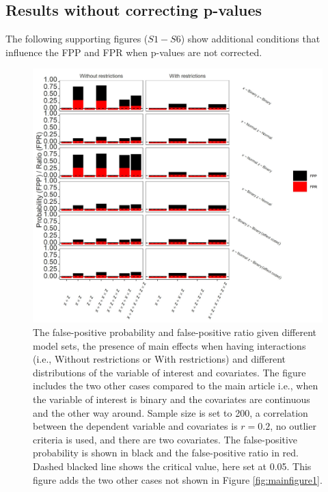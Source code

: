 \subsection{Results without correcting p-values}
The following supporting figures ($S1 - S6$) show additional conditions that influence the FPP and FPR when p-values are not corrected.

\label{result}
\begin{figure}[ht!]
\includegraphics[width=1\textwidth]{R/Analysis/Result/Figures/Figure1ASI.jpeg}
\centering
\caption{The false-positive probability and false-positive ratio given different model sets, the presence of main effects when having interactions (i.e., Without restrictions or With restrictions) and different distributions of the variable of interest and covariates. The figure includes the two other cases compared to the main article i.e., when the variable of interest is binary and the covariates are continuous and the other way around. Sample size is set to 200, a correlation between the dependent variable and covariates is $\textit{r}=0.2$, no outlier criteria is used, and there are two covariates. The false-positive probability is shown in black and the false-positive ratio in red. Dashed blacked line shows the critical value, here set at 0.05. This figure adds the two other cases not shown in Figure \ref{fig:mainfigure1}.}
\label{fig:appfigure1}
\end{figure}

